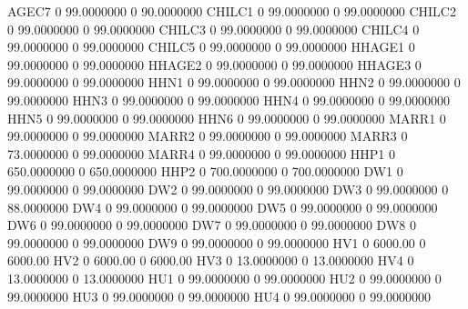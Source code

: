 \documentclass[
  11pt,
  a4paper,
  DIV=12,captions=tableheading,oneside,titlepage]{scrbook}
\let\oldverbatim\verbatim
\let\endoldverbatim\endverbatim
\renewenvironment{verbatim}{\footnotesize\oldverbatim}{\endoldverbatim}
\begin{document}
\begin{verbatim}
  AGEC7                  0    99.0000000             0    90.0000000 
  CHILC1                 0    99.0000000             0    99.0000000 
  CHILC2                 0    99.0000000             0    99.0000000 
  CHILC3                 0    99.0000000             0    99.0000000 
  CHILC4                 0    99.0000000             0    99.0000000 
  CHILC5                 0    99.0000000             0    99.0000000 
  HHAGE1                 0    99.0000000             0    99.0000000 
  HHAGE2                 0    99.0000000             0    99.0000000 
  HHAGE3                 0    99.0000000             0    99.0000000 
  HHN1                   0    99.0000000             0    99.0000000 
  HHN2                   0    99.0000000             0    99.0000000 
  HHN3                   0    99.0000000             0    99.0000000 
  HHN4                   0    99.0000000             0    99.0000000 
  HHN5                   0    99.0000000             0    99.0000000 
  HHN6                   0    99.0000000             0    99.0000000 
  MARR1                  0    99.0000000             0    99.0000000 
  MARR2                  0    99.0000000             0    99.0000000 
  MARR3                  0    73.0000000             0    99.0000000 
  MARR4                  0    99.0000000             0    99.0000000 
  HHP1                   0   650.0000000             0   650.0000000 
  HHP2                   0   700.0000000             0   700.0000000 
  DW1                    0    99.0000000             0    99.0000000 
  DW2                    0    99.0000000             0    99.0000000 
  DW3                    0    99.0000000             0    88.0000000 
  DW4                    0    99.0000000             0    99.0000000 
  DW5                    0    99.0000000             0    99.0000000 
  DW6                    0    99.0000000             0    99.0000000 
  DW7                    0    99.0000000             0    99.0000000 
  DW8                    0    99.0000000             0    99.0000000 
  DW9                    0    99.0000000             0    99.0000000 
  HV1                    0       6000.00             0       6000.00 
  HV2                    0       6000.00             0       6000.00 
  HV3                    0    13.0000000             0    13.0000000 
  HV4                    0    13.0000000             0    13.0000000 
  HU1                    0    99.0000000             0    99.0000000 
  HU2                    0    99.0000000             0    99.0000000 
  HU3                    0    99.0000000             0    99.0000000 
  HU4                    0    99.0000000             0    99.0000000 

\end{verbatim}
\end{document}
